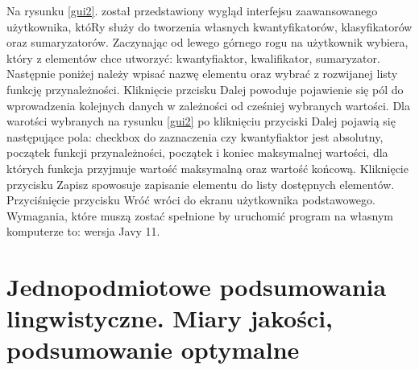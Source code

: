\documentclass{classrep}
\begin{document}
Na rysunku \ref{gui2}. został przedstawiony wygląd interfejsu zaawansowanego użytkownika, któRy służy do tworzenia własnych kwantyfikatorów, klasyfikatorów oraz sumaryzatorów. Zaczynając od lewego górnego rogu na użytkownik wybiera, który z elementów chce utworzyć: kwantyfiaktor, kwalifikator, sumaryzator. Następnie poniżej należy wpisać nazwę elementu oraz wybrać z rozwijanej listy funkcję przynależności. Kliknięcie przcisku Dalej powoduje pojawienie się pól do wprowadzenia kolejnych danych w zależności od cześniej wybranych wartości. Dla warotści wybranych na rysunku \ref{gui2} po kliknięciu przyciski Dalej pojawią się następujące pola: checkbox do zaznaczenia czy kwantyfiaktor jest absolutny, początek funkcji przynależności, początek i koniec maksymalnej wartości, dla których funkcja przyjmuje wartość maksymalną oraz wartość końcową. Kliknięcie przycisku Zapisz spowosuje zapisanie elementu do listy dostępnych elementów. Przyciśnięcie przycisku Wróć wróci do ekranu użytkownika podstawowego. \\

Wymagania, które muszą zostać spełnione by uruchomić program na własnym komputerze to: wersja Javy 11. 

\newpage




\section{ Jednopodmiotowe podsumowania lingwistyczne. Miary jakości, podsumowanie optymalne}
\label{section:ex}
\end{document}
